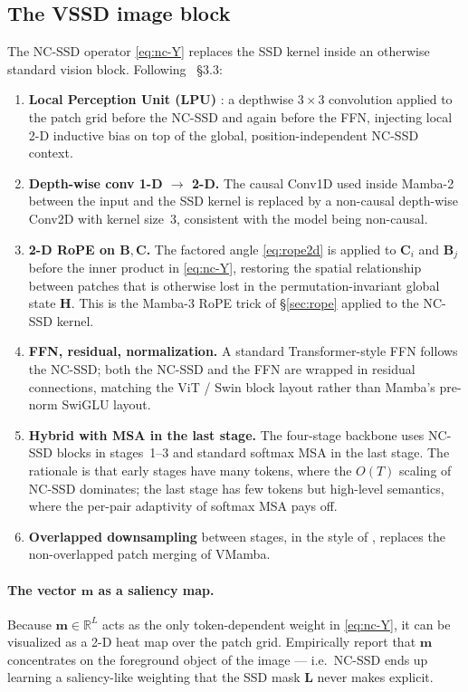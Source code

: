 \documentclass[11pt,a4paper]{article}
\begin{document}
\subsection{The VSSD image block}

The NC-SSD operator \eqref{eq:nc-Y} replaces the SSD kernel inside an
otherwise standard vision block. Following \cite{vssd}~\S 3.3:
\begin{enumerate}
  \item \textbf{Local Perception Unit (LPU)} \cite{vssd}: a depthwise
        $3{\times}3$ convolution applied to the patch grid before the
        NC-SSD and again before the FFN, injecting local 2-D
        inductive bias on top of the global, position-independent
        NC-SSD context.
  \item \textbf{Depth-wise conv 1-D $\to$ 2-D.} The causal Conv1D
        used inside Mamba-2 between the input and the SSD kernel is
        replaced by a non-causal depth-wise Conv2D with kernel
        size~$3$, consistent with the model being non-causal.
  \item \textbf{2-D RoPE on $\bm{B},\bm{C}$.} The factored angle
        \eqref{eq:rope2d} is applied to $\bm{C}_i$ and $\bm{B}_j$ before
        the inner product in \eqref{eq:nc-Y}, restoring the spatial
        relationship between patches that is otherwise lost in the
        permutation-invariant global state $\bm{H}$. This is the
        Mamba-3 RoPE trick of \S\ref{sec:rope} applied to the NC-SSD
        kernel.
  \item \textbf{FFN, residual, normalization.} A standard
        Transformer-style FFN follows the NC-SSD; both the NC-SSD and
        the FFN are wrapped in residual connections, matching the
        ViT / Swin block layout rather than Mamba's pre-norm SwiGLU
        layout.
  \item \textbf{Hybrid with MSA in the last stage.} The four-stage
        backbone uses NC-SSD blocks in stages~1--3 and standard
        softmax MSA in the last stage. The rationale is that early
        stages have many tokens, where the $O(T)$ scaling of NC-SSD
        dominates; the last stage has few tokens but high-level
        semantics, where the per-pair adaptivity of softmax MSA pays
        off.
  \item \textbf{Overlapped downsampling} between stages, in the
        style of \cite{vssd}, replaces the non-overlapped patch
        merging of VMamba.
\end{enumerate}
\paragraph{The vector $\bm{m}$ as a saliency map.} Because $\bm{m}\in
\mathbb{R}^{L}$ acts as the only token-dependent weight in
\eqref{eq:nc-Y}, it can be visualized as a 2-D heat map over the patch
grid. Empirically \cite{vssd} report that $\bm{m}$ concentrates on
the foreground object of the image — i.e.\ NC-SSD ends up learning a
saliency-like weighting that the SSD mask $\bm{L}$ never makes
explicit.
\end{document}
